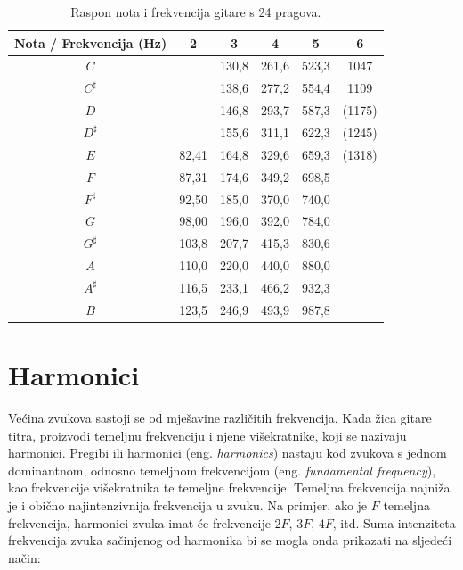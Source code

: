 \documentclass[times, utf8, diplomski, numeric]{fer}
\begin{document}
\begin{table}[h]
	\begin{center}
		\caption{Raspon nota i frekvencija gitare s 24 pragova.}
		\begin{tabular}{c|c c c c c}
			Nota / Frekvencija (Hz)  & 2 & 3 & 4 & 5 & 6\\
			\hline
			$C$ & & 130,8 & 261,6 & 523,3 & 1047\\
			\hline
			$C^\sharp$ &  & 138,6 & 277,2 & 554,4 & 1109\\
			\hline
			$D$ & & 146,8 & 293,7 & 587,3 & (1175)\\
			\hline
			$D^\sharp$ & & 155,6 & 311,1 & 622,3 & (1245)\\
			\hline
			$E$ & 82,41 & 164,8 & 329,6 & 659,3 & (1318)\\
			\hline
			$F$ & 87,31 &174,6 & 349,2 & 698,5 & \\
			\hline
			$F^\sharp$ & 92,50 & 185,0 & 370,0 & 740,0 & \\
			\hline
			$G$ & 98,00 & 196,0 & 392,0 & 784,0 & \\
			\hline
			$G^\sharp$ & 103,8 & 207,7 & 415,3 & 830,6 & \\
			\hline
			$A$ & 110,0 & 220,0 & 440,0 & 880,0 & \\
			\hline
			$A^\sharp$ & 116,5 & 233,1 & 466,2 & 932,3 & \\
			\hline
			$B$ & 123,5 & 246,9 & 493,9 & 987,8 & \\
		\end{tabular}
	\end{center}
\end{table}
%

\chapter{Harmonici}
Većina zvukova sastoji se od mješavine različitih frekvencija. Kada žica gitare titra, proizvodi temeljnu frekvenciju i njene višekratnike, koji se nazivaju harmonici. Pregibi ili harmonici (eng. \textit{harmonics}) nastaju kod zvukova s jednom dominantnom, odnosno temeljnom frekvencijom (eng. \textit{fundamental frequency}), kao frekvencije višekratnika te temeljne frekvencije.\cite{sethares2005tuning} Temeljna frekvencija najniža je i obično najintenzivnija frekvencija u zvuku.\cite{teachmeaudio2020} Na primjer, ako je $F$ temeljna frekvencija, harmonici zvuka imat će frekvencije $2F$, $3F$, $4F$, itd. Suma intenziteta frekvencija zvuka sačinjenog od harmonika bi se mogla onda prikazati na sljedeći način:
\end{document}
